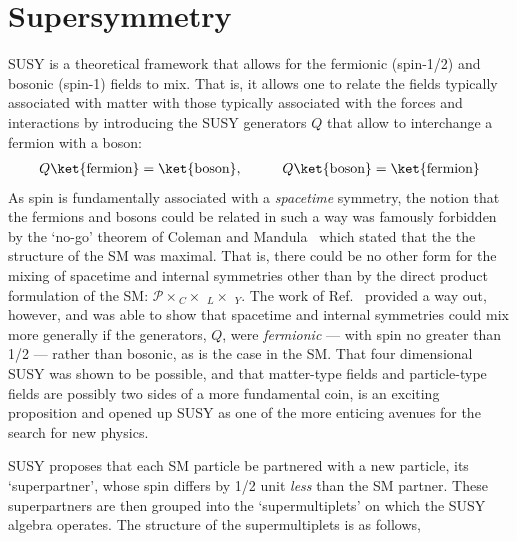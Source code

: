 \section{Supersymmetry}
\label{sec:susy}

SUSY is a theoretical framework that allows for the fermionic (spin-1/2) and bosonic (spin-1)
fields to mix.
That is, it allows one to relate the fields typically associated with matter with those
typically associated with the forces and interactions by introducing the SUSY generators $Q$ that
allow to interchange a fermion with a boson:
\begin{align}
    Q \ket{\text{fermion}} = \ket{\text{boson}}, \hspace{1cm} Q \ket{\text{boson}} = \ket{\text{fermion}}
    \label{eq:susy_operator}
\end{align}
As spin is fundamentally associated with a \textit{spacetime} symmetry, the notion 
that the fermions and bosons could be related in such a way was famously forbidden
by the `no-go' theorem of Coleman and Mandula~\cite{ColemanMandula} which stated that the
the structure
of the SM was maximal.
That is, there could be no other form for the mixing of spacetime and internal
symmetries other than by the direct product formulation of the SM: $\mathcal{P} \times$\SUthree$_C \times $ \SUtwo$_L \times$ \Uone$_{Y}$.
The work of Ref.~\cite{HaagSUSY} provided a way out, however, and was able to show
that spacetime and internal symmetries could mix more generally if the generators, $Q$, were \textit{fermionic} --- with spin no greater than 1/2 --- rather than
bosonic, as is the case in the SM.
That four dimensional SUSY was shown to be possible, and that matter-type fields and particle-type fields
are possibly two sides of a more fundamental coin, is an exciting proposition and opened
up SUSY as one of the more enticing avenues for the search for new physics.

SUSY proposes that each SM particle be partnered with a new particle, its `superpartner', whose spin differs
by 1/2 unit \textit{less} than the SM partner.
These superpartners are then grouped into the `supermultiplets'
on which the SUSY algebra operates.
The structure of the supermultiplets is as follows,

